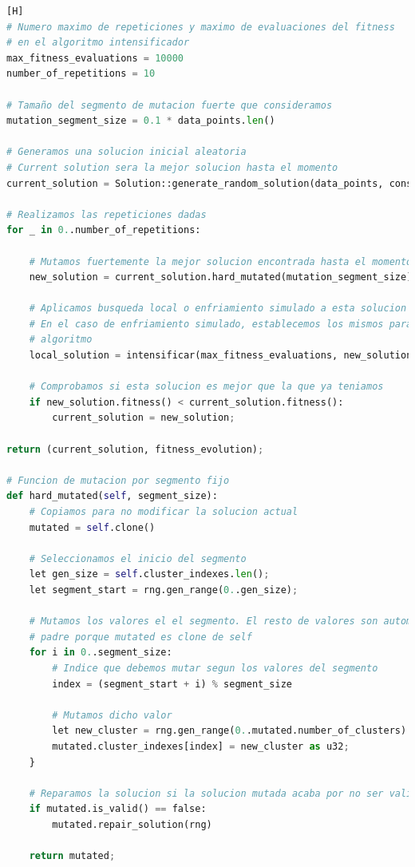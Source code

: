 \documentclass[11pt]{article}
\begin{document}
\begin{lstlisting}[language=Python, style=Boxed][H]
# Numero maximo de repeticiones y maximo de evaluaciones del fitness
# en el algoritmo intensificador
max_fitness_evaluations = 10000
number_of_repetitions = 10

# Tamaño del segmento de mutacion fuerte que consideramos
mutation_segment_size = 0.1 * data_points.len()

# Generamos una solucion inicial aleatoria
# Current solution sera la mejor solucion hasta el momento
current_solution = Solution::generate_random_solution(data_points, constraints, number_of_clusters, rng);

# Realizamos las repeticiones dadas
for _ in 0..number_of_repetitions:

    # Mutamos fuertemente la mejor solucion encontrada hasta el momento
    new_solution = current_solution.hard_mutated(mutation_segment_size)

    # Aplicamos busqueda local o enfriamiento simulado a esta solucion mutada fuertemente
    # En el caso de enfriamiento simulado, establecemos los mismos parametros que en este
    # algoritmo
    local_solution = intensificar(max_fitness_evaluations, new_solution)

    # Comprobamos si esta solucion es mejor que la que ya teniamos
    if new_solution.fitness() < current_solution.fitness():
        current_solution = new_solution;

return (current_solution, fitness_evolution);

# Funcion de mutacion por segmento fijo
def hard_mutated(self, segment_size):
    # Copiamos para no modificar la solucion actual
    mutated = self.clone()

    # Seleccionamos el inicio del segmento
    let gen_size = self.cluster_indexes.len();
    let segment_start = rng.gen_range(0..gen_size);

    # Mutamos los valores el el segmento. El resto de valores son automaticamente copiados del
    # padre porque mutated es clone de self
    for i in 0..segment_size:
        # Indice que debemos mutar segun los valores del segmento
        index = (segment_start + i) % segment_size

        # Mutamos dicho valor
        let new_cluster = rng.gen_range(0..mutated.number_of_clusters)
        mutated.cluster_indexes[index] = new_cluster as u32;
    }

    # Reparamos la solucion si la solucion mutada acaba por no ser valida
    if mutated.is_valid() == false:
        mutated.repair_solution(rng)

    return mutated;
\end{lstlisting}
\end{document}
